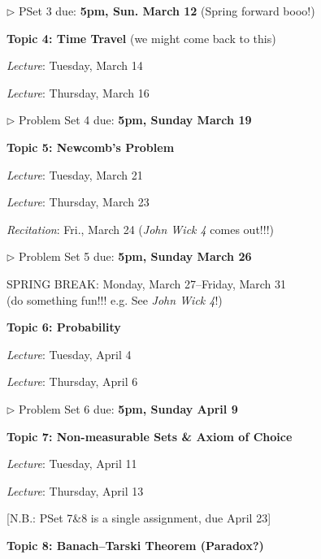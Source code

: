 \documentclass[11pt, a4paper]{article}
\begin{document}
\begin{center}
\begin{minipage}{4.5in}
\begin{flushleft}
$\triangleright$ PSet 3 due: \textbf{5pm, Sun. March 12} (Spring forward booo!)



\item[\textbf{Topic 4: Time Travel} (we might come back to this)]
\item

\emph{Lecture}: Tuesday, March 14

\emph{Lecture}: Thursday, March 16

$\triangleright$ Problem Set 4 due: \textbf{5pm, Sunday March 19}

\item[\textbf{Topic 5: Newcomb's Problem}]

\item

\emph{Lecture}: Tuesday, March 21

\emph{Lecture}: Thursday, March 23

\emph{Recitation}: Fri., March 24 (\textit{John Wick 4} comes out!!!)

$\triangleright$ Problem Set 5 due: \textbf{5pm, Sunday March 26}

SPRING BREAK: Monday, March 27--Friday, March 31 \\ (do something fun!!! e.g. See \textit{John Wick 4}!)



\item[\textbf{Topic 6: Probability}]
\item

\emph{Lecture}: Tuesday, April 4

\emph{Lecture}: Thursday, April 6

$\triangleright$ Problem Set 6 due: \textbf{5pm, Sunday April 9}



\item[\textbf{Topic 7: Non-measurable Sets \& Axiom of Choice}]
\item

\emph{Lecture}: Tuesday, April 11

\emph{Lecture}: Thursday, April 13

[N.B.: PSet 7\&8 is a single assignment, due April 23]


\item[\textbf{Topic 8: Banach--Tarski Theorem (Paradox?)}]


\end{flushleft}
\end{minipage}
\end{center}
\end{document}
